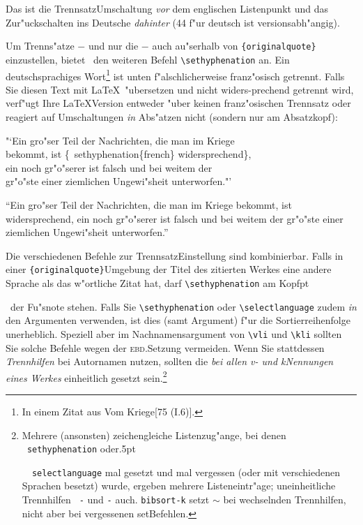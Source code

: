 \documentclass[12pt,a4paper]{article}
\newcommand{\pdfko}[1]{\kern #1pt
                          \strut\ignorespaces}%
\newcommand{\pbs}{\string\ \unskip}
\newcommand{\bs}{\protect\pbs}
\begin{document}
\vspace{-0.75ex}\noindent 
Das ist die Trennsatz\hy Umschaltung \textit{vor} dem englischen Listenpunkt 
und das Zur"uckschalten ins Deutsche \textit{dahinter} (44 f"ur deutsch ist
versionsabh"angig).

\vspace{1.25ex}\noindent
Um Trenns"atze $-$ und nur die $-$ auch au"serhalb von \verb|{originalquote}| 
einzustellen, bietet \BibArts\ den weiteren Befehl \verb|\sethyphenation| an. 
Ein deutschsprachiges Wort\footnote{In einem Zitat aus 
{Vom Kriege}[75 (I.6)].} ist unten f"alschlicherweise franz"osisch getrennt. 
Falls Sie diesen Text mit \LaTeX\ "ubersetzen und nicht widers-prechend 
getrennt wird, verf"ugt Ihre \LaTeX\hy Version entweder "uber keinen 
franz"osischen Trennsatz oder reagiert auf Umschaltungen \textit{in} 
Abs"atzen nicht (sondern nur am Absatzkopf):

    \vspace{2ex}%
    \noindent\hspace{1.9em}\parbox{12.5cm}{\small\ttfamily
    \string"\string`Ein gro"ser Teil der Nachrichten, die man im Kriege \\
    bekommt, ist \{\bs sethyphenation\{french\} widersprechend\}, \\
    ein noch gr"o"serer ist falsch und bei weitem der \\
    gr"o"ste einer ziemlichen Ungewi"sheit unterworfen.\string"\string'
    }

    \vspace{2ex}%
    \noindent\hspace{1.9em}\parbox{12.5cm}{\small
    "`Ein gro"ser Teil der Nachrichten, die man im Kriege 
    bekommt, ist { widersprechend}, 
    ein noch gr"o"serer ist falsch und bei weitem der 
    gr"o"ste einer ziemlichen Ungewi"sheit unterworfen."'
    }

\vspace{2.5ex}\noindent
Die verschiedenen Befehle zur Trennsatz\hy Einstellung sind
kombinierbar. Falls in einer \verb|{originalquote}|\hy Umgebung 
der Titel des zitierten Werkes eine andere Sprache als das 
w"ortliche Zitat hat, darf \verb|\sethyphenation| am Kopf\pdfko{1.5}\ 
der Fu"snote stehen. Falls Sie \verb|\sethyphenation| oder 
\verb|\selectlanguage| zudem \textit{in} den 
\BibArts\hy Argumenten verwenden, ist dies (samt Argument) f"ur die
Sortierreihenfolge unerheblich. Speziell aber im Nachnamensargument
von \verb|\vli| und \verb|\kli| sollten Sie solche Befehle wegen der
\textsc{ebd.}\hy Setzung vermeiden. Wenn Sie stattdessen \textit{Trennhilfen} 
bei Autornamen nutzen, sollten die \textit{bei allen 
v- und k\fhy Nennungen eines Werkes} einheitlich gesetzt
sein.\footnote{Mehrere (ansonsten) zeichengleiche Listenzug"ange, 
bei denen \texttt{\bs sethyphenation} oder\pdfko{.5}\ 
\texttt{\bs selectlanguage} mal gesetzt und 
mal vergessen (oder mit verschiedenen Sprachen besetzt) 
wurde, ergeben mehrere Listeneintr"age; uneinheitliche 
Trennhilfen \texttt{\bs-} und \texttt{\dq-} auch.
\texttt{bibsort\hspace{.3em}-k} \hspace{.2em}setzt $\sim$ 
bei wechselnden Trennhilfen, nicht aber bei vergessenen 
set\hy Befehlen.} 
\end{document}
